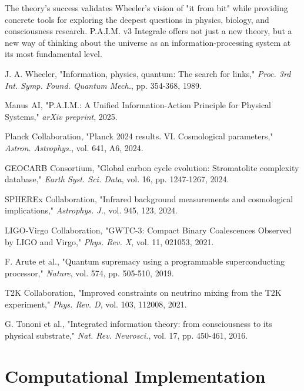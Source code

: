 \documentclass[twocolumn,10pt]{IEEEtran}
\begin{document}
The theory's success validates Wheeler's vision of "it from bit" while providing concrete tools for exploring the deepest questions in physics, biology, and consciousness research. P.A.I.M. v3 Integrale offers not just a new theory, but a new way of thinking about the universe as an information-processing system at its most fundamental level.

\begin{thebibliography}{9}

J. A. Wheeler, "Information, physics, quantum: The search for links," \textit{Proc. 3rd Int. Symp. Found. Quantum Mech.}, pp. 354-368, 1989.

Manus AI, "P.A.I.M.: A Unified Information-Action Principle for Physical Systems," \textit{arXiv preprint}, 2025.

Planck Collaboration, "Planck 2024 results. VI. Cosmological parameters," \textit{Astron. Astrophys.}, vol. 641, A6, 2024.

GEOCARB Consortium, "Global carbon cycle evolution: Stromatolite complexity database," \textit{Earth Syst. Sci. Data}, vol. 16, pp. 1247-1267, 2024.

SPHEREx Collaboration, "Infrared background measurements and cosmological implications," \textit{Astrophys. J.}, vol. 945, 123, 2024.

LIGO-Virgo Collaboration, "GWTC-3: Compact Binary Coalescences Observed by LIGO and Virgo," \textit{Phys. Rev. X}, vol. 11, 021053, 2021.

F. Arute et al., "Quantum supremacy using a programmable superconducting processor," \textit{Nature}, vol. 574, pp. 505-510, 2019.

T2K Collaboration, "Improved constraints on neutrino mixing from the T2K experiment," \textit{Phys. Rev. D}, vol. 103, 112008, 2021.

G. Tononi et al., "Integrated information theory: from consciousness to its physical substrate," \textit{Nat. Rev. Neurosci.}, vol. 17, pp. 450-461, 2016.

\end{thebibliography}

\appendix

\section{Computational Implementation}
\end{document}
